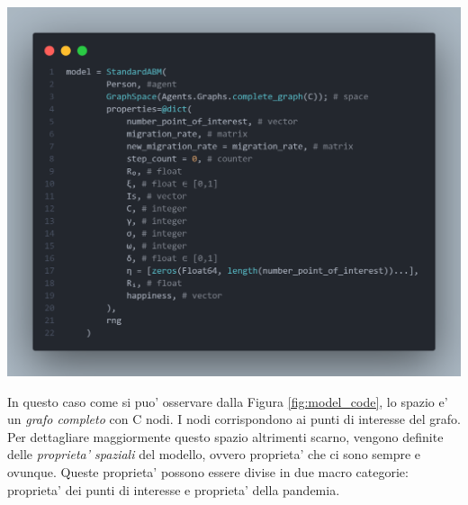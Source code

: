 \begin{minipage}{\linewidth}
    \centering
    \includegraphics[width=\textwidth]{img/model_code.png}
    \label{fig:model_code}
\end{minipage}

In questo caso come si puo' osservare dalla Figura \ref{fig:model_code}, lo spazio 
e' un \emph{grafo completo} con C nodi. I nodi corrispondono ai punti di interesse del 
grafo. Per dettagliare maggiormente questo spazio altrimenti scarno, vengono definite delle 
\emph{proprieta' spaziali} del modello, ovvero proprieta' che ci sono sempre e ovunque. 
Queste proprieta' possono essere divise in due macro categorie: proprieta' dei punti di interesse
e proprieta' della pandemia.

